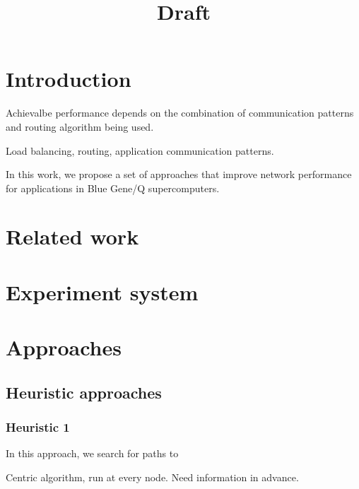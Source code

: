 \documentclass[letter]{article}
\title{Draft}
\begin{document}
\maketitle

\section{Introduction}
Achievalbe performance depends on the combination of communication patterns and routing algorithm being used.

Load balancing, routing, application communication patterns.

In this work, we propose a set of approaches that improve network performance for applications in Blue Gene/Q supercomputers. 

\section{Related work}

\section{Experiment system}

\section{Approaches}

\subsection{Heuristic approaches}

\subsubsection{Heuristic 1}
In this approach, we search for paths to 

Centric algorithm, run at every node. Need information in advance.




\end{document}
